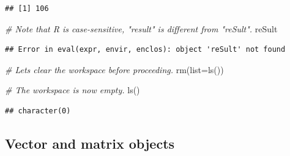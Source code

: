 \documentclass[
]{book}
\newenvironment{Shaded}{\begin{snugshade}}{\end{snugshade}}
\newcommand{\AttributeTok}[1]{\textcolor[rgb]{0.77,0.63,0.00}{#1}}
\newcommand{\CommentTok}[1]{\textcolor[rgb]{0.56,0.35,0.01}{\textit{#1}}}
\newcommand{\FunctionTok}[1]{\textcolor[rgb]{0.00,0.00,0.00}{#1}}
\newcommand{\NormalTok}[1]{#1}
\begin{document}
\begin{verbatim}
## [1] 106
\end{verbatim}

\begin{Shaded}
\begin{Highlighting}[]
\CommentTok{\# Note that R is case{-}sensitive, "result" is different from "reSult".}
\NormalTok{reSult}
\end{Highlighting}
\end{Shaded}

\begin{verbatim}
## Error in eval(expr, envir, enclos): object 'reSult' not found
\end{verbatim}

\begin{Shaded}
\begin{Highlighting}[]
\CommentTok{\# Let\textquotesingle{}s clear the workspace before proceeding.}
\FunctionTok{rm}\NormalTok{(}\AttributeTok{list=}\FunctionTok{ls}\NormalTok{())}

\CommentTok{\# The workspace is now empty.}
\FunctionTok{ls}\NormalTok{()}
\end{Highlighting}
\end{Shaded}

\begin{verbatim}
## character(0)
\end{verbatim}

\hypertarget{vector-and-matrix-objects}{%
\subsection{Vector and matrix objects}\label{vector-and-matrix-objects}}
\end{document}

